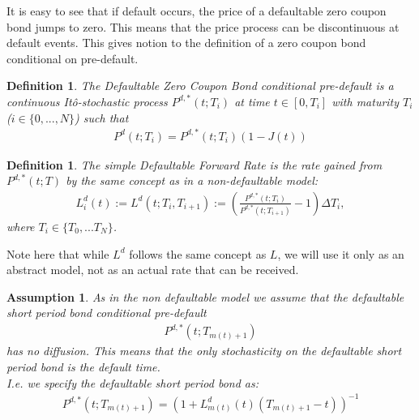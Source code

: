 \documentclass[12pt]{article}
\newtheorem{assumption}{Assumption}[section]
\newtheorem{definition}[theorem]{Definition}
\begin{document}
	It is easy to see that if default occurs, the price of a defaultable zero coupon bond jumps to zero. This means that the price process can be discontinuous at default events. This gives notion to the definition of a zero coupon bond conditional on pre-default.
	\begin{definition}
		The \emph{Defaultable Zero Coupon Bond conditional pre-default} is a continuous Itô-stochastic process \(P^{d,*}(t; T_i)\) at time \(t \in \left[0, T_i\right]\) with maturity $T_i$ ($i \in \{0, ..., N\}$) such that
		\begin{align*}
			P^{d}(t; T_i) = P^{d,*}(t; T_i)(1 - J(t))
		\end{align*}
	\end{definition}
	\begin{definition}
		The \emph{simple Defaultable Forward Rate} is the rate gained from \(P^{d,*}(t; T)\) by the same concept as in a non-defaultable model:
		\begin{align}\label{defLIBOR}
		L^{d}_i(t) := L^{d}(t; T_i, T_{i+1}) := \left( \frac{P^{d,*}(t; T_i)}{P^{d,*}(t; T_{i+1})} - 1\right) \Delta T_i,
		\end{align}
		where \(T_i \in \{T_0, ... T_N\}\).
	\end{definition}
	Note here that while $L^d$ follows the same concept as $L$, we will use it only as an abstract model, not as an actual rate that can be received.
	
	\begin{assumption}
		\label{as:DLMMShortPeriodBond}
		As in the non defaultable model we assume that the defaultable short period bond conditional pre-default
		\begin{align*}
			P^{d,*}(t;T_{m(t)+1})
		\end{align*}
		has no diffusion. This means that the only stochasticity on the defaultable short period bond is the default time.\\
		I.e. we specify the defaultable short period bond as:
		\begin{align*}
			P^{d,*}(t;T_{m(t)+1}) = (1 + L^d_{m(t)}(t)(T_{m(t)+1} - t))^{-1}
		\end{align*}
	\end{assumption}
	
\end{document}
